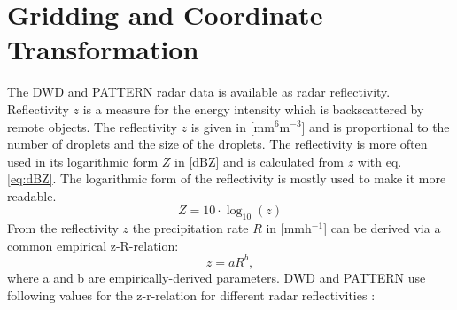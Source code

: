\documentclass[11pt,twoside,a4paper,fleqn,x11names]{report}
\numberwithin{equation}{chapter}
\numberwithin{figure}{chapter}
\numberwithin{table}{chapter}
\begin{document}
\section{Gridding and Coordinate Transformation}
\label{subsec:grid}
The DWD and PATTERN radar data is available as radar reflectivity. Reflectivity $z$ is a measure for the energy intensity which is backscattered by remote objects. The reflectivity $z$ is given in [mm$^{6}$m$^{-3}$] and is proportional to the number of droplets and the size of the droplets. The reflectivity is more often used in its logarithmic form $Z$ in [dBZ] and is calculated from $z$ with eq. \ref{eq:dBZ}. The logarithmic form of the reflectivity is mostly used to make it more readable.
\begin{equation}
Z  = 10 \cdot \log _{10}(z)
\label{eq:dBZ}
\end{equation}
From the reflectivity $z$ the precipitation rate $R$ in [mmh$^{-1}$] can be derived via a common empirical z-R-relation:
\begin{equation}
z = aR^{b},
\label{eq:zr}
\end{equation}
where a and b are empirically-derived parameters. DWD and PATTERN use following values for the z-r-relation for different radar reflectivities \citep{Lengfeld2014}:

\end{document}
